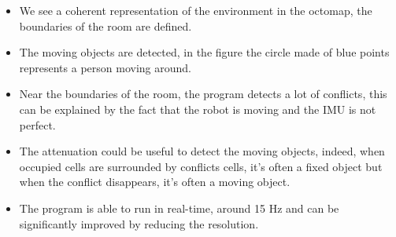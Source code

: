 \begin{itemize}
    \item We see a coherent representation of the environment in the octomap, the boundaries of the room are defined.
    \item The moving objects are detected, in the figure the circle made of blue points represents a person moving around.
    \item Near the boundaries of the room, the program detects a lot of conflicts, this can be explained by the fact that the robot is moving and the IMU is not perfect.
    \item The attenuation could be useful to detect the moving objects, indeed, when occupied cells are surrounded by conflicts cells, it's often a fixed object but when the conflict disappears, it's often a moving object.
    \item The program is able to run in real-time, around 15 Hz and can be significantly improved by reducing the resolution.
\end{itemize}

